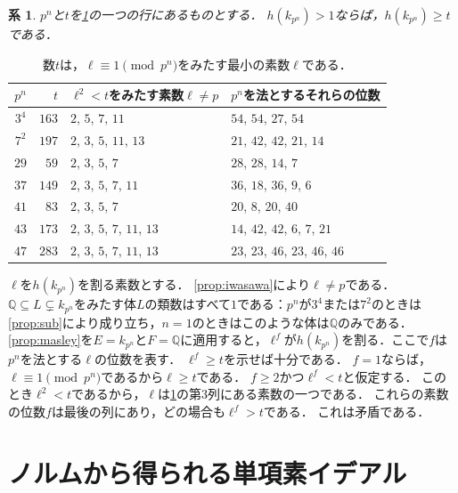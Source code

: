 \documentclass[11pt,a4paper]{ltjsarticle}
\makeatletter
\theoremstyle{ja}
\newtheorem{corollary}[theorem]{系}
\renewenvironment{proof}[1][証明]{\par
  \pushQED{\qed}\normalfont \topsep6\p@\@plus6\p@\relax
  \trivlist
  \item[\hskip\labelsep\bfseries #1]\hspace{1\zw}\ignorespaces
}{\popQED\endtrivlist\@endpefalse}
\makeatother
\begin{document}
\begin{corollary} \label{cor:threshold}
$p^n$と$t$を\cref{tab:threshold}の一つの行にあるものとする．
$h(k_{p^n}) > 1$ならば，$h(k_{p^n}) \ge t$である．
\end{corollary}

\begin{table}[h]
\centering
\begin{tabular}{crll}
\toprule
$p^n$ & $t$ & $\ell^2 < t$をみたす素数$\ell \ne p$ & $p^n$を法とするそれらの位数 \\
\midrule
$3^4$ & $163$ & $2$, $5$, $7$, $11$ & $54$, $54$, $27$, $54$ \\
$7^2$ & $197$ & $2$, $3$, $5$, $11$, $13$ & $21$, $42$, $42$, $21$, $14$ \\
$29$ & $59$ & $2$, $3$, $5$, $7$ & $28$, $28$, $14$, $7$ \\
$37$ & $149$ & $2$, $3$, $5$, $7$, $11$ & $36$, $18$, $36$, $9$, $6$ \\
$41$ & $83$ & $2$, $3$, $5$, $7$ & $20$, $8$, $20$, $40$ \\
$43$ & $173$ & $2$, $3$, $5$, $7$, $11$, $13$ & $14$, $42$, $42$, $6$, $7$, $21$ \\
$47$ & $283$ & $2$, $3$, $5$, $7$, $11$, $13$ & $23$, $23$, $46$, $23$, $46$, $46$ \\
\bottomrule
\end{tabular}
\caption{数$t$は，$\ell \equiv 1 \pmod{p^n}$をみたす最小の素数$\ell$である．}
\label{tab:threshold}
\end{table}

\begin{proof}
$\ell$を$h(k_{p^n})$を割る素数とする．
\cref{prop:iwasawa}により$\ell \ne p$である．
$\mathbb{Q} \subseteq L \subsetneq k_{p^n}$をみたす体$L$の類数はすべて$1$である：$p^n$が$3^4$または$7^2$のときは\cref{prop:sub}により成り立ち，$n = 1$のときはこのような体は$\mathbb{Q}$のみである．
\cref{prop:masley}を$E = k_{p^n}$と$F = \mathbb{Q}$に適用すると，$\ell^f$が$h(k_{p^n})$を割る．ここで$f$は$p^n$を法とする$\ell$の位数を表す．
$\ell^f \ge t$を示せば十分である．
$f = 1$ならば，$\ell \equiv 1 \pmod{p^n}$であるから$\ell \ge t$である．
$f \ge 2$かつ$\ell^f < t$と仮定する．
このとき$\ell^2 < t$であるから，$\ell$は\cref{tab:threshold}の第3列にある素数の一つである．
これらの素数の位数$f$は最後の列にあり，どの場合も$\ell^f > t$である．
これは矛盾である．
\end{proof}

\section{ノルムから得られる単項素イデアル} \label{sec:relations}
\end{document}
